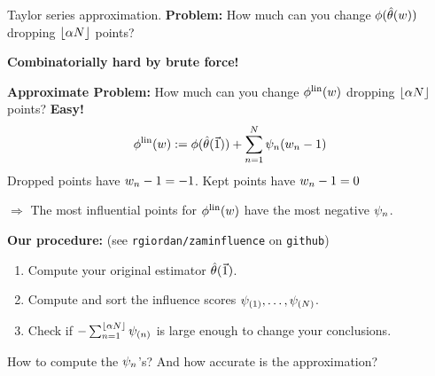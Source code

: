 \begin{frame}{Taylor series approximation.}
%
\textbf{Problem: }
%
How much can you change $\phi(\hat{\theta}(w))$
dropping $\lfloor \alpha N \rfloor$ points?

\textbf{Combinatorially hard by brute force!}

\hrulefill

\pause
\textbf{Approximate Problem: }
%
How much can you change $\phi^{\mathrm{lin}}(w)$
dropping $\lfloor \alpha N \rfloor$ points?
%
\textbf{Easy! }
%
\begin{align*}
    \phi^{\mathrm{lin}}(w)
		:=  \phi(\hat{\theta}(\vec{1})) +
        \sum_{n=1}^N \psi_n (w_n -1)
\end{align*}
%
Dropped points have $w_n - 1 = -1$.  Kept points have $w_n - 1 = 0$

$\Rightarrow$ The most influential points for $\phi^{\mathrm{lin}}(w)$ have the
most negative $\psi_n$.

\hrulefill

\pause
\textbf{Our procedure:}  (see \texttt{rgiordan/zaminfluence} on \texttt{github})
\begin{enumerate}
    \item Compute your original estimator $\hat{\theta}(\vec{1})$.
    \item Compute and sort the influence scores
        $\psi_{(1)}, \ldots, \psi_{(N)}$.
    \item Check if $- \sum_{n=1}^{\lfloor \alpha N \rfloor} \psi_{(n)}$ is large
    enough to change your conclusions.
\end{enumerate}

\pause
How to compute the $\psi_n$'s?  And how accurate is the approximation?

\end{frame}


